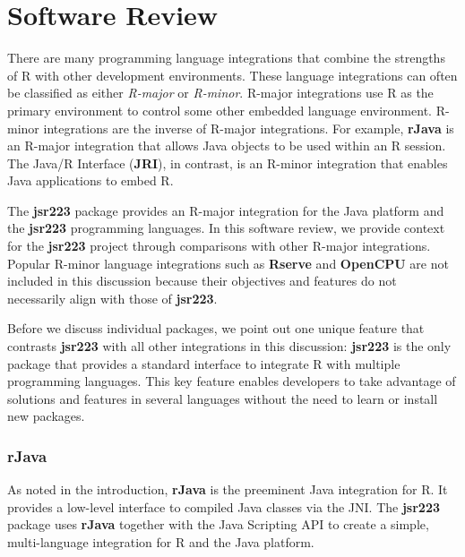 
\chapter{Software Review}

There are many programming language integrations that combine the strengths of R with other development environments. These language integrations can often be classified as either \textit{R-major} or \textit{R-minor}. R-major integrations use R as the primary environment to control some other embedded language environment. R-minor integrations are the inverse of R-major integrations. For example, \textbf{rJava} is an R-major integration that allows Java objects to be used within an R session. The Java/R Interface (\textbf{JRI}), in contrast, is an R-minor integration that enables Java applications to embed R.

The \textbf{jsr223} package provides an R-major integration for the Java platform and the \textbf{jsr223} programming languages. In this software review, we provide context for the \textbf{jsr223} project through comparisons with other R-major integrations. Popular R-minor language integrations such as \textbf{Rserve} \citep{rserve} and \textbf{OpenCPU} \citep{opencpu} are not included in this discussion because their objectives and features do not necessarily align with those of \textbf{jsr223}.

Before we discuss individual packages, we point out one unique feature that contrasts \textbf{jsr223} with all other integrations in this discussion: \textbf{jsr223} is the only package that provides a standard interface to integrate R with multiple programming languages. This key feature enables developers to take advantage of solutions and features in several languages without the need to learn or install new packages.

\subsection{\textbf{rJava}}

As noted in the introduction, \textbf{rJava} is the preeminent Java integration for R. It provides a low-level interface to compiled Java classes via the JNI. The \textbf{jsr223} package uses \textbf{rJava} together with the Java Scripting API to create a simple, multi-language integration for R and the Java platform.


